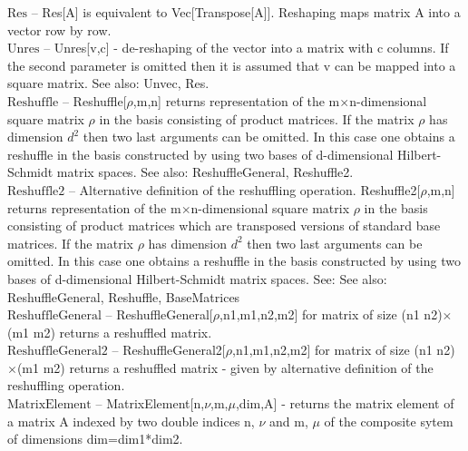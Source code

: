 \noindent\textbf{$ \text{Res} $ }-- Res[A] is equivalent to Vec[Transpose[A]]. Reshaping maps matrix A into a vector row by row.$  $\\[6pt]

\noindent\textbf{$ \text{Unres} $ }-- Unres[v,c] - de-reshaping of the vector into a matrix with c columns. If the second parameter is omitted then it is assumed that v can be mapped into a square matrix. See also: Unvec, Res.$  $\\[6pt]

\noindent\textbf{$ \text{Reshuffle} $ }-- Reshuffle[$\rho $,m,n] returns representation of the m$\times $n-dimensional square matrix $\rho $ in the basis consisting of product matrices. If  the matrix $\rho $ has dimension $ d^2 $ then two last arguments can be omitted. In this case one obtains a reshuffle in the basis constructed by using two bases of d-dimensional Hilbert-Schmidt matrix spaces. See also: ReshuffleGeneral, Reshuffle2.$  $\\[6pt]

\noindent\textbf{$ \text{Reshuffle2} $ }-- Alternative definition of the reshuffling operation. Reshuffle2[$\rho $,m,n] returns representation of the m$\times $n-dimensional square matrix $\rho $ in the basis consisting of product matrices which are transposed versions of standard base matrices. If the matrix $\rho $ has dimension $ d^2 $ then two last arguments can be omitted. In this case one obtains a reshuffle in the basis constructed by using two bases of d-dimensional Hilbert-Schmidt matrix spaces. See: See also: ReshuffleGeneral, Reshuffle, BaseMatrices$  $\\[6pt]

\noindent\textbf{$ \text{ReshuffleGeneral} $ }-- ReshuffleGeneral[$\rho $,n1,m1,n2,m2] for matrix of size (n1 n2)$\times $(m1 m2) returns a reshuffled matrix.$  $\\[6pt]

\noindent\textbf{$ \text{ReshuffleGeneral2} $ }-- ReshuffleGeneral2[$\rho $,n1,m1,n2,m2] for matrix of size (n1 n2)$\times $(m1 m2) returns a reshuffled matrix - given by alternative definition of the reshuffling operation.$  $\\[6pt]

\noindent\textbf{$ \text{MatrixElement} $ }-- MatrixElement[n,$\nu $,m,$\mu $,dim,A] - returns the matrix element of a matrix A indexed by two double indices n, $\nu $ and m, $\mu $ of the composite sytem of dimensions dim=dim1*dim2.$  $\\[6pt]

